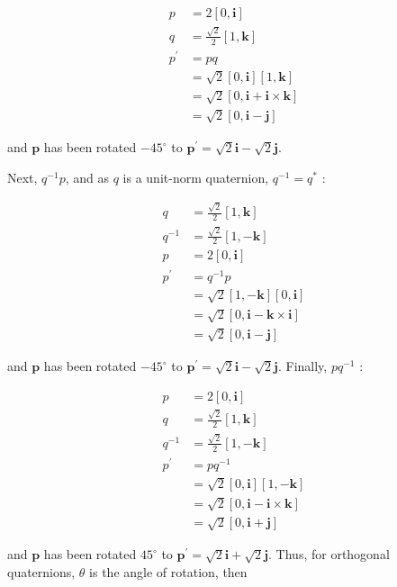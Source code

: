 \documentclass[10pt]{article}
\begin{document}
$$
\begin{aligned}
p & =2[0, \mathbf{i}] \\
q & =\frac{\sqrt{2}}{2}[1, \mathbf{k}] \\
p^{\prime} & =p q \\
& =\sqrt{2}[0, \mathbf{i}][1, \mathbf{k}] \\
& =\sqrt{2}[0, \mathbf{i}+\mathbf{i} \times \mathbf{k}] \\
& =\sqrt{2}[0, \mathbf{i}-\mathbf{j}]
\end{aligned}
$$

and $\mathbf{p}$ has been rotated $-45^{\circ}$ to $\mathbf{p}^{\prime}=\sqrt{2} \mathbf{i}-\sqrt{2} \mathbf{j}$.

Next, $q^{-1} p$, and as $q$ is a unit-norm quaternion, $q^{-1}=q^{*}$ :

$$
\begin{aligned}
q & =\frac{\sqrt{2}}{2}[1, \mathbf{k}] \\
q^{-1} & =\frac{\sqrt{2}}{2}[1,-\mathbf{k}] \\
p & =2[0, \mathbf{i}] \\
p^{\prime} & =q^{-1} p \\
& =\sqrt{2}[1,-\mathbf{k}][0, \mathbf{i}] \\
& =\sqrt{2}[0, \mathbf{i}-\mathbf{k} \times \mathbf{i}] \\
& =\sqrt{2}[0, \mathbf{i}-\mathbf{j}]
\end{aligned}
$$

and $\mathbf{p}$ has been rotated $-45^{\circ}$ to $\mathbf{p}^{\prime}=\sqrt{2} \mathbf{i}-\sqrt{2} \mathbf{j}$. Finally, $p q^{-1}$ :

$$
\begin{aligned}
p & =2[0, \mathbf{i}] \\
q & =\frac{\sqrt{2}}{2}[1, \mathbf{k}] \\
q^{-1} & =\frac{\sqrt{2}}{2}[1,-\mathbf{k}] \\
p^{\prime} & =p q^{-1} \\
& =\sqrt{2}[0, \mathbf{i}][1,-\mathbf{k}] \\
& =\sqrt{2}[0, \mathbf{i}-\mathbf{i} \times \mathbf{k}] \\
& =\sqrt{2}[0, \mathbf{i}+\mathbf{j}]
\end{aligned}
$$

and $\mathbf{p}$ has been rotated $45^{\circ}$ to $\mathbf{p}^{\prime}=\sqrt{2} \mathbf{i}+\sqrt{2} \mathbf{j}$. Thus, for orthogonal quaternions, $\theta$ is the angle of rotation, then
\end{document}
